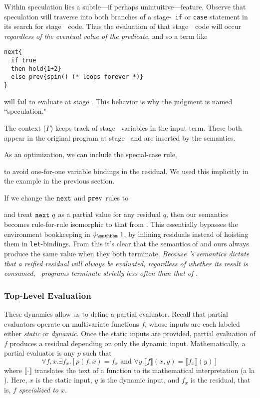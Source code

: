 Within speculation lies a subtle---if perhaps unintuitive---feature.  
Observe that speculation will traverse into both branches of a stage-\bbtwo\ {\tt if} or {\tt case} 
statement in its search for stage~\bbone\ code. 
Thus the evaluation of that stage~\bbone\ code will occur {\em regardless of the eventual value of the predicate},
and so a term like 
\begin{lstlisting} 
next{
  if true 
  then hold{1+2} 
  else prev{spin() (* loops forever *)}
}
\end{lstlisting}
will fail to evaluate at stage \bbone.
This behavior is why the judgment is named ``speculation."

The context ($\Gamma$) keeps track of stage \bbtwo\ variables in the input term. 
These both appear in the original program at stage \bbtwo\ and are inserted by the semantics.

As an optimization, we can include the special-case rule,
\begin{mathpar}
\end{mathpar}
to avoid one-for-one variable bindings in the residual.
We used this implicitly in the example in the previous section.

If we change the $\next$ and $\prev$ rules to 
and treat $\next~q$ as a partial value for any residual $q$,
then our semantics becomes rule-for-rule isomorphic to that from \cite{davies96}. This essentially bypasses the
environment bookkeeping in $\redonesym$, by inlining residuals instead of
hoisting them in \verb|let|-bindings.
From this it's clear that the semantics of \cite{davies96} and ours always produce the same value when they both terminate.
{\em Because \lang's semantics dictate that a reified residual will always be evaluated, regardless of whether its result is consumed, \lang\ programs terminate strictly less often than that of \cite{davies96}}.

\subsubsection {Top-Level Evaluation}
\label{sec:partialeval}

These dynamics allow us to define a partial evaluator.
Recall that partial evaluators operate on multivariate functions $f$, whose
inputs are each labeled either {\em static} or {\em dynamic}. Once the static
inputs are provided, partial evaluation of $f$ produces a residual depending on
only the dynamic input. Mathematically, a partial evaluator is any $p$ such
that
\[
	\forall f,x. \exists f_x. [p(f,x) = f_x \text{ and } \forall y.\llbracket f \rrbracket(x,y)=\llbracket f_x \rrbracket(y)]
\]
where $\llbracket \cdot \rrbracket$ translates the text of a function to its
mathematical interpretation (a la \cite{jones96}). Here, $x$ is the static
input, $y$ is the dynamic input, and $f_x$ is the residual, that is, \emph{$f$
specialized to $x$}.

